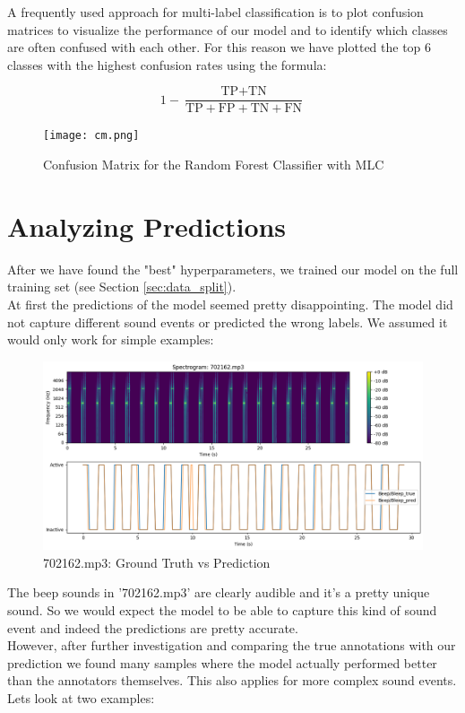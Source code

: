 \documentclass{article}
\begin{document}
A frequently used approach for multi-label classification is to plot confusion matrices to visualize the performance of our model and to identify which classes are often confused with each other. For this reason
we have plotted the top 6 classes with the highest confusion rates using the formula:

\begin{equation}
1 - \frac{\text{TP} + \text{TN}}{\text{TP} + \text{FP} + \text{TN} + \text{FN}}
\end{equation}

\begin{figure}[H]
  \centering
  \texttt{[image: cm.png]}
  \caption{Confusion Matrix for the Random Forest Classifier with MLC}
  \label{fig6}
\end{figure}

\section{Analyzing Predictions}
\label{sec:analyzing_predictions}
After we have found the "best" hyperparameters, we trained our model on the full training set (see Section \ref{sec:data_split}). \\
At first the predictions of the model seemed pretty disappointing. The model did not capture different sound events or predicted the wrong labels. We assumed it would only work for simple examples:

\begin{figure}[H]
  \centering
  \includegraphics[width=0.75\linewidth]{702162_pred.png}
  \caption{702162.mp3: Ground Truth vs Prediction}
  \label{fig7}
\end{figure}

The beep sounds in '702162.mp3' are clearly audible and it's a pretty unique sound. So we would expect the model to be able to capture this kind of sound event and indeed the predictions are pretty accurate. \\
However, after further investigation and comparing the true annotations with our prediction we found many samples where the model actually performed better than the annotators themselves. This also applies for more complex sound events. Lets look at two examples:
\end{document}

